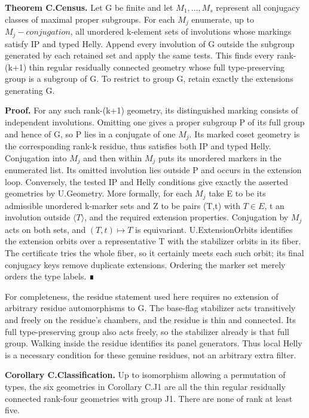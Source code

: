 \documentclass[
  11pt,
  a4paper,
]{article}
\newcounter{none} %
\begin{document}
\textbf{Theorem C.Census.} Let G be finite and let \(M_{1},\ldots ,M_s\)
represent all conjugacy classes of maximal proper subgroups. For each
\(M_j\) enumerate, up to \(M_j-conjugation\), all unordered k-element
sets of involutions whose markings satisfy IP and typed Helly. Append
every involution of G outside the subgroup generated by each retained
set and apply the same tests. This finds every rank-(k+1) thin regular
residually connected geometry whose full type-preserving group is a
subgroup of G. To restrict to group G, retain exactly the extensions
generating G.

\textbf{Proof.} For any such rank-(k+1) geometry, its distinguished
marking consists of independent involutions. Omitting one gives a proper
subgroup P of its full group and hence of G, so P lies in a conjugate of
one \(M_j\). Its marked coset geometry is the corresponding rank-k
residue, thus satisfies both IP and typed Helly. Conjugation into
\(M_j\) and then within \(M_j\) puts its unordered markers in the
enumerated list. Its omitted involution lies outside P and occurs in the
extension loop. Conversely, the tested IP and Helly conditions give
exactly the asserted geometries by U.Geometry. More formally, for each
\(M_j\) take E to be its admissible unordered k-marker sets and Z to be
pairs (T,t) with \(T\in E\), t an involution outside
\(\langle T\rangle\), and the required extension properties. Conjugation
by \(M_j\) acts on both sets, and \((T,t)\mapsto T\) is equivariant.
U.ExtensionOrbits identifies the extension orbits over a representative
T with the stabilizer orbits in its fiber. The certificate tries the
whole fiber, so it certainly meets each such orbit; its final conjugacy
keys remove duplicate extensions. Ordering the marker set merely orders
the type labels. ∎

For completeness, the residue statement used here requires no extension
of arbitrary residue automorphisms to G. The base-flag stabilizer acts
transitively and freely on the residue's chambers, and the residue is
thin and connected. Its full type-preserving group also acts freely, so
the stabilizer already is that full group. Walking inside the residue
identifies its panel generators. Thus local Helly is a necessary
condition for these genuine residues, not an arbitrary extra filter.

\textbf{Corollary C.Classification.} Up to isomorphism allowing a
permutation of types, the six geometries in Corollary C.J1 are all the
thin regular residually connected rank-four geometries with group J1.
There are none of rank at least five.
\end{document}

